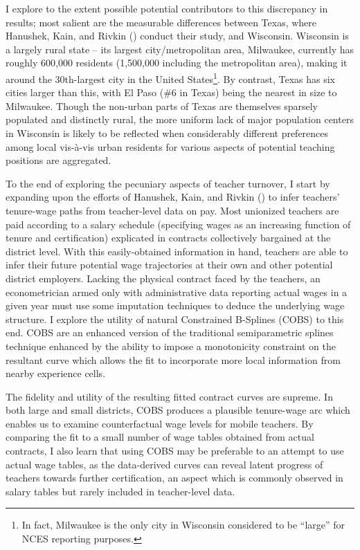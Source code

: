 I explore to the extent possible potential contributors to this
discrepancy in results; most salient are the measurable differences
between Texas, where Hanushek, Kain, and Rivkin
(\citeyearpar{hanushek}) conduct their study, and
Wisconsin. Wisconsin is a largely rural state -- its largest
city/metropolitan area, Milwaukee, currently has roughly 600,000
residents (1,500,000 including the metropolitan area), making it around
the 30th-largest city in the United States\footnote{In fact, Milwaukee
  is the only city in Wisconsin considered to be ``large'' for NCES
  reporting purposes.}. By contrast, Texas has six cities larger than
this, with El Paso (\#6 in Texas) being the nearest in size to
Milwaukee. Though the non-urban parts of Texas are themselves sparsely
populated and distinctly rural, the more uniform lack of major
population centers in Wisconsin is likely to be reflected when
considerably different preferences among local vis-à-vis urban residents
for various aspects of potential teaching positions are aggregated.

To the end of exploring the pecuniary aspects of teacher turnover, I
start by expanding upon the efforts of Hanushek, Kain, and Rivkin
(\citeyearpar{hanushek}) to infer teachers' tenure-wage
paths from teacher-level data on pay. Most unionized teachers are paid
according to a salary schedule (specifying wages as an increasing
function of tenure and certification) explicated in contracts
collectively bargained at the district level. With this easily-obtained
information in hand, teachers are able to infer their future potential
wage trajectories at their own and other potential district employers.
Lacking the physical contract faced by the teachers, an econometrician
armed only with administrative data reporting actual wages in a given
year must use some imputation techniques to deduce the underlying wage
structure. I explore the utility of natural Constrained B-Splines
(COBS) to this end. COBS are an enhanced version of the traditional
semiparametric splines technique enhanced by the ability to impose a
monotonicity constraint on the resultant curve which allows the fit to
incorporate more local information from nearby experience cells.

The fidelity and utility of the resulting fitted contract curves are
supreme. In both large and small districts, COBS produces a plausible
tenure-wage arc which enables us to examine counterfactual wage levels
for mobile teachers. By comparing the fit to a small number of wage
tables obtained from actual contracts, I also learn that using COBS may
be preferable to an attempt to use actual wage tables, as the
data-derived curves can reveal latent progress of teachers towards
further certification, an aspect which is commonly observed in salary
tables but rarely included in teacher-level data.

